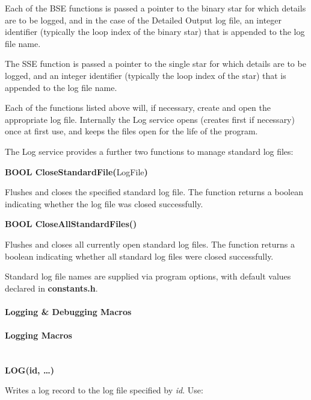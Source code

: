 \medskip
Each of the BSE functions is passed a pointer to the binary star for which details are to be logged, and in the case of the Detailed Output log file, an integer identifier (typically the loop index of the binary star) that is appended to the log file name.

The SSE function is passed a pointer to the single star for which details are to be logged, and an integer identifier (typically the loop index of the star) that is appended to the log file name.

Each of the functions listed above will, if necessary, create and open the appropriate log file. Internally the Log service opens (creates first if necessary) once at first use, and keeps the files open for the life of the program.

The Log service provides a further two functions to manage standard log files:

\bigskip
\hfill
\begin{minipage}{\dimexpr\textwidth-2em}

    \textbf{BOOL CloseStandardFile(}LogFile\textbf{)}

    \medskip
    Flushes and closes the specified standard log file. The function returns a boolean indicating whether the log file was closed successfully.

    \bigskip
    \textbf{BOOL CloseAllStandardFiles()}

    \medskip
    Flushes and closes all currently open standard log files. The function returns a boolean indicating whether all standard log files were closed successfully.
\end{minipage}

\bigskip
Standard log file names are supplied via program options, with default values declared in \textbf{constants.h}.

\newpage
\paragraph{Logging \& Debugging Macros}\label{sec:LoggingDebuggingMacros}

\paragraph{Logging Macros}\label{sec:LoggingMacros}\mbox{} \\

\textbf{LOG(id, {\dots})}

Writes a log record to the log file specified by \textit{id}.  Use:

